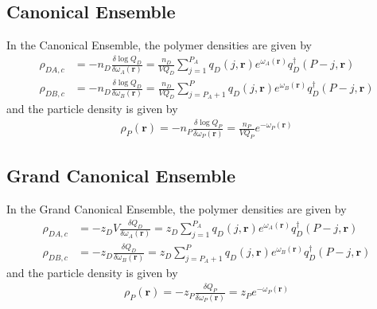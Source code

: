 \documentclass{article}
\begin{document}
  \subsection{Canonical Ensemble}
  
  In the Canonical Ensemble, the polymer densities are given by
  \begin{align*}
    \rho_{DA,c} &=
      -n_D \frac{\delta \log Q_D}{\delta \omega_A(\mathbf{r})}
      = \frac{n_D}{V Q_D}
      \sum_{j=1}^{P_A}
      q_D(j, \mathbf{r})
      e^{\omega_A(\mathbf{r})}
      q_D^\dagger(P-j, \mathbf{r}) \\
    \rho_{DB,c} &=
      -n_D \frac{\delta \log Q_D}{\delta \omega_B(\mathbf{r})}
      = \frac{n_D}{V Q_D}
      \sum_{j=P_A+1}^{P}
      q_D(j, \mathbf{r})
      e^ {\omega_B(\mathbf{r})}
      q_D^\dagger(P-j, \mathbf{r})
  \end{align*}
  and the particle density is given by
  \begin{align*}
    \rho_P(\mathbf{r}) =
      -n_P \frac{\delta \log Q_P}{\delta \omega_P(\mathbf{r})}
      = \frac{n_P}{V Q_P} e^{-\omega_P(\mathbf{r})}
  \end{align*}
  
  \subsection{Grand Canonical Ensemble}
  
  In the Grand Canonical Ensemble, the polymer densities are given by
  \begin{align*}
    \rho_{DA,c} &=
      -z_D V \frac{\delta Q_D}{\delta \omega_A(\mathbf{r})}
      = z_D
      \sum_{j=1}^{P_A}
      q_D(j, \mathbf{r})
      e^{\omega_A(\mathbf{r})}
      q_D^\dagger(P-j, \mathbf{r}) \\
    \rho_{DB,c} &=
      -z_D \frac{\delta Q_D}{\delta \omega_B(\mathbf{r})}
      = z_D
      \sum_{j=P_A+1}^{P}
      q_D(j, \mathbf{r})
      e^ {\omega_B(\mathbf{r})}
      q_D^\dagger(P-j, \mathbf{r})
  \end{align*}
  and the particle density is given by
  \begin{align*}
    \rho_P(\mathbf{r}) =
      -z_P \frac{\delta Q_P}{\delta \omega_P(\mathbf{r})}
      = z_P e^{-\omega_P(\mathbf{r})}
  \end{align*}
  
  
\end{document}
